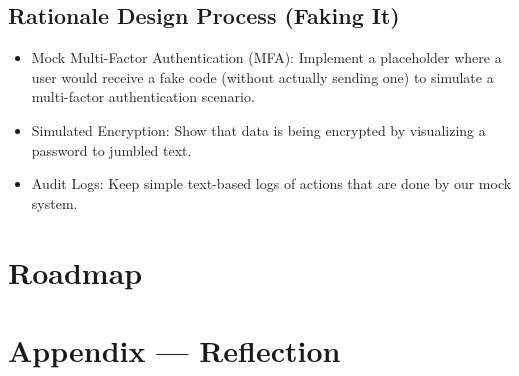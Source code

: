 \documentclass{article}
\begin{document}
\subsection{Rationale Design Process (Faking It)}
\begin{itemize}
    \item Mock Multi-Factor Authentication (MFA): Implement a placeholder where a user would receive a fake code (without actually sending one) to simulate a multi-factor authentication scenario.
    \item Simulated Encryption: Show that data is being encrypted by visualizing a password to jumbled text. 
    \item Audit Logs: Keep simple text-based logs of actions that are done by our mock system.
\end{itemize}

\section{Roadmap}


\newpage{}

\section*{Appendix --- Reflection}


\end{document}
